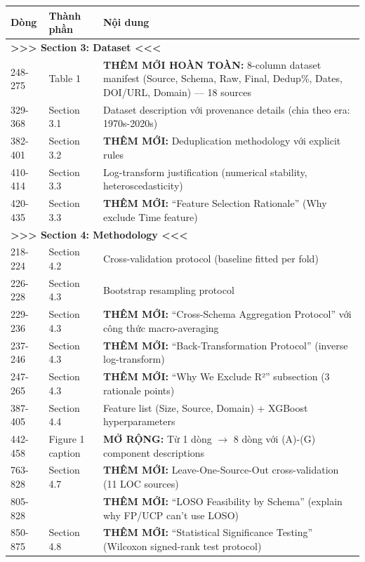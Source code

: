 \documentclass[11pt,a4paper]{article}
\begin{document}
\begin{longtable}{p{}p{}p{}}
\toprule
\textbf{Dòng} & \textbf{Thành phần} & \textbf{Nội dung} \\
\midrule
\multicolumn{3}{l}{\textbf{>>> Section 3: Dataset <<<}} \\
\midrule
248-275 & Table 1 & \textbf{THÊM MỚI HOÀN TOÀN:} 8-column dataset manifest (Source, Schema, Raw, Final, Dedup\%, Dates, DOI/URL, Domain) --- 18 sources \\
329-368 & Section 3.1 & Dataset description với provenance details (chia theo era: 1970s-2020s) \\
382-401 & Section 3.2 & \textbf{THÊM MỚI:} Deduplication methodology với explicit rules \\
410-414 & Section 3.3 & Log-transform justification (numerical stability, heteroscedasticity) \\
420-435 & Section 3.3 & \textbf{THÊM MỚI:} ``Feature Selection Rationale'' (Why exclude Time feature) \\
\midrule
\multicolumn{3}{l}{\textbf{>>> Section 4: Methodology <<<}} \\
\midrule
218-224 & Section 4.2 & Cross-validation protocol (baseline fitted per fold) \\
226-228 & Section 4.3 & Bootstrap resampling protocol \\
229-236 & Section 4.3 & \textbf{THÊM MỚI:} ``Cross-Schema Aggregation Protocol'' với công thức macro-averaging \\
237-246 & Section 4.3 & \textbf{THÊM MỚI:} ``Back-Transformation Protocol'' (inverse log-transform) \\
247-265 & Section 4.3 & \textbf{THÊM MỚI:} ``Why We Exclude R²'' subsection (3 rationale points) \\
387-405 & Section 4.4 & Feature list (Size, Source, Domain) + XGBoost hyperparameters \\
442-458 & Figure 1 caption & \textbf{MỞ RỘNG:} Từ 1 dòng $\rightarrow$ 8 dòng với (A)-(G) component descriptions \\
763-828 & Section 4.7 & \textbf{THÊM MỚI:} Leave-One-Source-Out cross-validation (11 LOC sources) \\
805-828 & & \textbf{THÊM MỚI:} ``LOSO Feasibility by Schema'' (explain why FP/UCP can't use LOSO) \\
850-875 & Section 4.8 & \textbf{THÊM MỚI:} ``Statistical Significance Testing'' (Wilcoxon signed-rank test protocol) \\
\bottomrule
\end{longtable}
\end{document}
